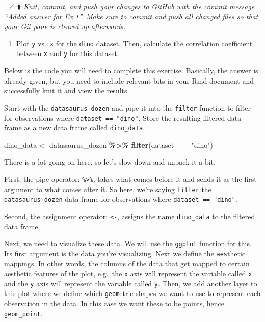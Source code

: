 \documentclass[
]{article}
\newenvironment{Shaded}{\begin{snugshade}}{\end{snugshade}}
\newcommand{\FunctionTok}[1]{\textcolor[rgb]{0.13,0.29,0.53}{\textbf{#1}}}
\newcommand{\NormalTok}[1]{#1}
\newcommand{\OtherTok}[1]{\textcolor[rgb]{0.56,0.35,0.01}{#1}}
\newcommand{\SpecialCharTok}[1]{\textcolor[rgb]{0.81,0.36,0.00}{\textbf{#1}}}
\newcommand{\StringTok}[1]{\textcolor[rgb]{0.31,0.60,0.02}{#1}}
\providecommand{\tightlist}{%
  \setlength{\itemsep}{0pt}\setlength{\parskip}{0pt}}
\begin{document}
🧶 ✅ ⬆️ \emph{Knit, commit, and push your changes to GitHub with the
commit message ``Added answer for Ex 1''. Make sure to commit and push
all changed files so that your Git pane is cleared up afterwards.}

\begin{enumerate}
\def\labelenumi{\arabic{enumi}.}
\setcounter{enumi}{1}
\tightlist
\item
  Plot \texttt{y} vs.~\texttt{x} for the \texttt{dino} dataset. Then,
  calculate the correlation coefficient between \texttt{x} and
  \texttt{y} for this dataset.
\end{enumerate}

Below is the code you will need to complete this exercise. Basically,
the answer is already given, but you need to include relevant bits in
your Rmd document and successfully knit it and view the results.

Start with the \texttt{datasaurus\_dozen} and pipe it into the
\texttt{filter} function to filter for observations where
\texttt{dataset\ ==\ "dino"}. Store the resulting filtered data frame as
a new data frame called \texttt{dino\_data}.

\begin{Shaded}
\begin{Highlighting}[]
\NormalTok{dino\_data }\OtherTok{\textless{}{-}}\NormalTok{ datasaurus\_dozen }\SpecialCharTok{\%\textgreater{}\%}
  \FunctionTok{filter}\NormalTok{(dataset }\SpecialCharTok{==} \StringTok{"dino"}\NormalTok{)}
\end{Highlighting}
\end{Shaded}

There is a lot going on here, so let's slow down and unpack it a bit.

First, the pipe operator: \texttt{\%\textgreater{}\%}, takes what comes
before it and sends it as the first argument to what comes after it. So
here, we're saying \texttt{filter} the \texttt{datasaurus\_dozen} data
frame for observations where \texttt{dataset\ ==\ "dino"}.

Second, the assignment operator: \texttt{\textless{}-}, assigns the name
\texttt{dino\_data} to the filtered data frame.

Next, we need to visualize these data. We will use the \texttt{ggplot}
function for this. Its first argument is the data you're visualizing.
Next we define the \texttt{aes}thetic mappings. In other words, the
columns of the data that get mapped to certain aesthetic features of the
plot, e.g.~the \texttt{x} axis will represent the variable called
\texttt{x} and the \texttt{y} axis will represent the variable called
\texttt{y}. Then, we add another layer to this plot where we define
which \texttt{geom}etric shapes we want to use to represent each
observation in the data. In this case we want these to be points, hence
\texttt{geom\_point}.
\end{document}
